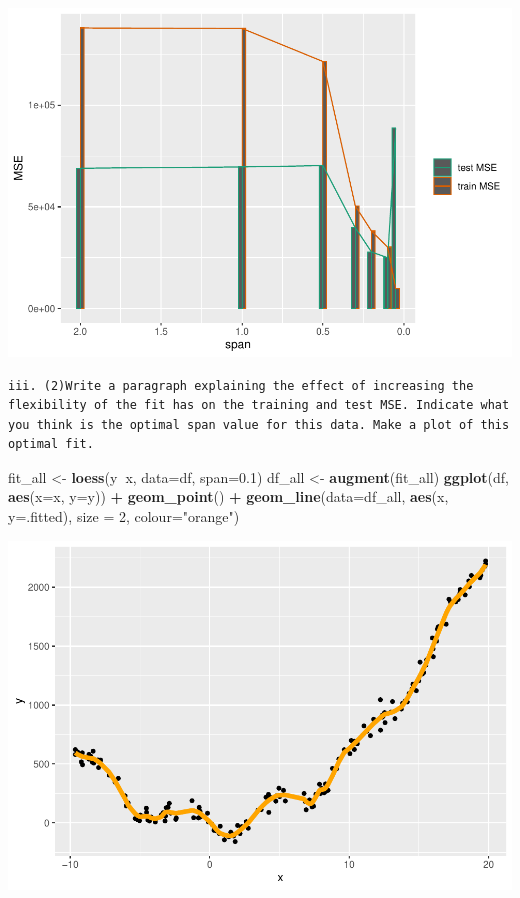 \documentclass[
]{article}
\newenvironment{Shaded}{\begin{snugshade}}{\end{snugshade}}
\newcommand{\DataTypeTok}[1]{\textcolor[rgb]{0.13,0.29,0.53}{#1}}
\newcommand{\DecValTok}[1]{\textcolor[rgb]{0.00,0.00,0.81}{#1}}
\newcommand{\FloatTok}[1]{\textcolor[rgb]{0.00,0.00,0.81}{#1}}
\newcommand{\KeywordTok}[1]{\textcolor[rgb]{0.13,0.29,0.53}{\textbf{#1}}}
\newcommand{\NormalTok}[1]{#1}
\newcommand{\OperatorTok}[1]{\textcolor[rgb]{0.81,0.36,0.00}{\textbf{#1}}}
\newcommand{\StringTok}[1]{\textcolor[rgb]{0.31,0.60,0.02}{#1}}
\begin{document}
\includegraphics{assignment1_files/figure-latex/unnamed-chunk-4-1.pdf}

\begin{verbatim}
iii. (2)Write a paragraph explaining the effect of increasing the flexibility of the fit has on the training and test MSE. Indicate what you think is the optimal span value for this data. Make a plot of this optimal fit.
\end{verbatim}

\begin{Shaded}
\begin{Highlighting}[]
\NormalTok{fit_all <-}\StringTok{ }\KeywordTok{loess}\NormalTok{(y}\OperatorTok{~}\NormalTok{x, }\DataTypeTok{data=}\NormalTok{df, }\DataTypeTok{span=}\FloatTok{0.1}\NormalTok{)}
\NormalTok{df_all <-}\StringTok{ }\KeywordTok{augment}\NormalTok{(fit_all)}
\KeywordTok{ggplot}\NormalTok{(df, }\KeywordTok{aes}\NormalTok{(}\DataTypeTok{x=}\NormalTok{x, }\DataTypeTok{y=}\NormalTok{y)) }\OperatorTok{+}\StringTok{ }\KeywordTok{geom_point}\NormalTok{() }\OperatorTok{+}
\StringTok{  }\KeywordTok{geom_line}\NormalTok{(}\DataTypeTok{data=}\NormalTok{df_all, }\KeywordTok{aes}\NormalTok{(x, }\DataTypeTok{y=}\NormalTok{.fitted), }\DataTypeTok{size =} \DecValTok{2}\NormalTok{, }\DataTypeTok{colour=}\StringTok{"orange"}\NormalTok{)}
\end{Highlighting}
\end{Shaded}

\includegraphics{assignment1_files/figure-latex/unnamed-chunk-5-1.pdf}
\end{document}
